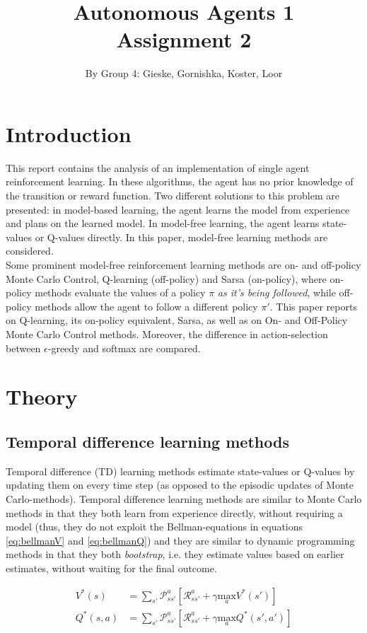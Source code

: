 \documentclass{article}
\begin{document}
\title{Autonomous Agents 1 \\ Assignment 2}

\author{By Group 4: Gieske, Gornishka, Koster, Loor}
\maketitle
\pagebreak
\tableofcontents


\pagebreak

\section{Introduction}
This report contains the analysis of an implementation of single agent reinforcement learning. In these algorithms, the agent has no prior knowledge of the transition or reward function. Two different solutions to this problem are presented: in model-based learning, the agent learns the model from experience and plans on the learned model. In model-free learning, the agent learns state-values or Q-values directly. In this paper, model-free learning methods are considered.\\
Some prominent model-free reinforcement learning methods are on- and off-policy Monte Carlo Control, Q-learning (off-policy) and Sarsa (on-policy), where on-policy methods evaluate the values of a policy $\pi$ \textit{as it's being followed}, while off-policy methods allow the agent to follow a different policy $\pi'$. This paper reports on Q-learning, its on-policy equivalent, Sarsa, as well as on On- and Off-Policy Monte Carlo Control methods. Moreover, the difference in action-selection between $\epsilon$-greedy and softmax are compared. 
\pagebreak

\section{Theory}
\subsection{Temporal difference learning methods}
Temporal difference (TD) learning methods estimate state-values or Q-values by updating them on every time step (as opposed to the episodic updates of Monte Carlo-methods).
Temporal difference learning methods are similar to Monte Carlo methods in that they both learn from experience directly, without requiring a model (thus, they do not exploit the Bellman-equations in equations \ref{eq:bellmanV} and \ref{eq:bellmanQ}) and they are similar to dynamic programming methods in that they both \textit{bootstrap}, i.e. they estimate values based on earlier estimates, without waiting for the final outcome. 
\begin{mdframed}
\begin{align}
V^*(s) &= \sum_{s'} \mathcal{P}^a_{ss'}\left[ \mathcal{R}^a_{ss'} + \gamma \underset{a}{\text{max}}V^*(s') \right]\label{eq:bellmanV}\\
Q^*(s,a) &= \sum_{s'} \mathcal{P}^a_{ss'}\left[ \mathcal{R}^a_{ss'} + \gamma \underset{a}{\text{max}}Q^*(s', a') \right]\label{eq:bellmanQ}
\end{align}
\end{mdframed}
\end{document}
